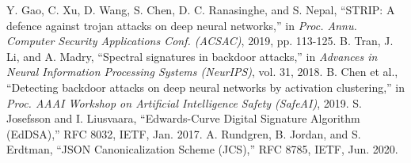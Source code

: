  Y. Gao, C. Xu, D. Wang, S. Chen, D. C. Ranasinghe, and S. Nepal, ``STRIP: A defence against trojan attacks on deep neural networks,'' in \emph{Proc. Annu. Computer Security Applications Conf. (ACSAC)}, 2019, pp. 113-125.
 B. Tran, J. Li, and A. Madry, ``Spectral signatures in backdoor attacks,'' in \emph{Advances in Neural Information Processing Systems (NeurIPS)}, vol. 31, 2018.
 B. Chen et al., ``Detecting backdoor attacks on deep neural networks by activation clustering,'' in \emph{Proc. AAAI Workshop on Artificial Intelligence Safety (SafeAI)}, 2019.
 S. Josefsson and I. Liusvaara, ``Edwards-Curve Digital Signature Algorithm (EdDSA),'' RFC 8032, IETF, Jan. 2017.
 A. Rundgren, B. Jordan, and S. Erdtman, ``JSON Canonicalization Scheme (JCS),'' RFC 8785, IETF, Jun. 2020.

